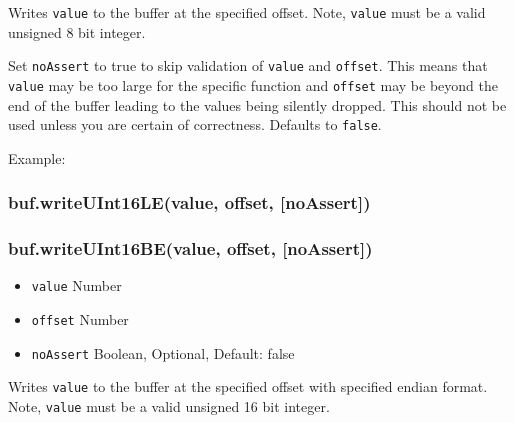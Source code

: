 Writes \texttt{value} to the buffer at the specified offset. Note,
\texttt{value} must be a valid unsigned 8 bit integer.

Set \texttt{noAssert} to true to skip validation of \texttt{value} and
\texttt{offset}. This means that \texttt{value} may be too large for the
specific function and \texttt{offset} may be beyond the end of the
buffer leading to the values being silently dropped. This should not be
used unless you are certain of correctness. Defaults to \texttt{false}.

Example:

\begin{Shaded}
\begin{Highlighting}[]
  \NormalTok{);}
\NormalTok{(}\NormalTok{, }\NormalTok{);}
\NormalTok{(}\NormalTok{, }\NormalTok{);}
\NormalTok{(}\NormalTok{, }\NormalTok{);}
\NormalTok{(}\NormalTok{, }\NormalTok{);}


\end{Highlighting}
\end{Shaded}

\subsubsection{buf.writeUInt16LE(value, offset, {[}noAssert{]})}

\subsubsection{buf.writeUInt16BE(value, offset, {[}noAssert{]})}

\begin{itemize}
\item
  \texttt{value} Number
\item
  \texttt{offset} Number
\item
  \texttt{noAssert} Boolean, Optional, Default: false
\end{itemize}

Writes \texttt{value} to the buffer at the specified offset with
specified endian format. Note, \texttt{value} must be a valid unsigned
16 bit integer.

